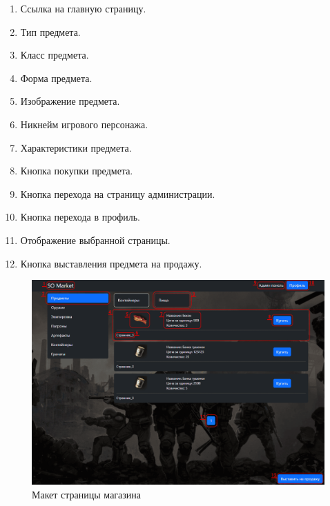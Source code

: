 \begin{enumerate}
	\item Ссылка на главную страницу.
	\item Тип предмета.
	\item Класс предмета.
	\item Форма предмета.
	\item Изображение предмета.
	\item Никнейм игрового персонажа.
	\item Характеристики предмета.
	\item Кнопка покупки предмета.
	\item Кнопка перехода на страницу администрации.
	\item Кнопка перехода в профиль.
	\item Отображение выбранной страницы.
	\item Кнопка выставления предмета на продажу.
\end{enumerate}

\begin{figure}
	\centering
	\includegraphics[width=0.7\linewidth]{images/shop_maket}
	\caption{Макет страницы магазина}
	\label{fig:shopmaket}
\end{figure}

